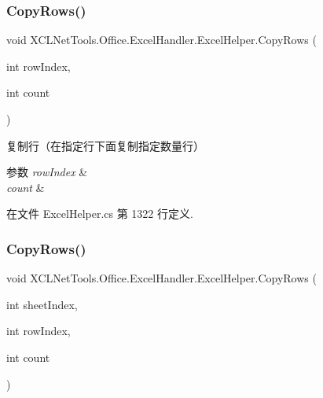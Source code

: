 \subsubsection{\texorpdfstring{Copy\+Rows()}{CopyRows()}\hspace{0.1cm}{\footnotesize\ttfamily [1/2]}}
{\footnotesize\ttfamily void X\+C\+L\+Net\+Tools.\+Office.\+Excel\+Handler.\+Excel\+Helper.\+Copy\+Rows (\begin{DoxyParamCaption}\item[{int}]{row\+Index,  }\item[{int}]{count }\end{DoxyParamCaption})}



复制行（在指定行下面复制指定数量行） 


\begin{DoxyParams}{参数}
{\em row\+Index} & \\
\hline
{\em count} & \\
\hline
\end{DoxyParams}


在文件 Excel\+Helper.\+cs 第 1322 行定义.

\mbox{\label{class_x_c_l_net_tools_1_1_office_1_1_excel_handler_1_1_excel_helper_ae5ca11d360518bfcf0ec30506120adfb}} 
\subsubsection{\texorpdfstring{Copy\+Rows()}{CopyRows()}\hspace{0.1cm}{\footnotesize\ttfamily [2/2]}}
{\footnotesize\ttfamily void X\+C\+L\+Net\+Tools.\+Office.\+Excel\+Handler.\+Excel\+Helper.\+Copy\+Rows (\begin{DoxyParamCaption}\item[{int}]{sheet\+Index,  }\item[{int}]{row\+Index,  }\item[{int}]{count }\end{DoxyParamCaption})}



